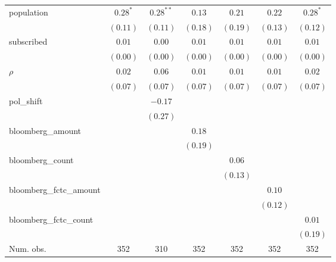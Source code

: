 \begin{table}[!h]
\begin{center}
\begin{tabular}{l c c c c c c }
population              & $0.28^{*}$   & $0.28^{**}$  & $0.13$       & $0.21$       & $0.22$       & $0.28^{*}$   \\
                        & $(0.11)$     & $(0.11)$     & $(0.18)$     & $(0.19)$     & $(0.13)$     & $(0.12)$     \\
subscribed              & $0.01$       & $0.00$       & $0.01$       & $0.01$       & $0.01$       & $0.01$       \\
                        & $(0.00)$     & $(0.00)$     & $(0.00)$     & $(0.00)$     & $(0.00)$     & $(0.00)$     \\
$\rho$                  & $0.02$       & $0.06$       & $0.01$       & $0.01$       & $0.01$       & $0.02$       \\
                        & $(0.07)$     & $(0.07)$     & $(0.07)$     & $(0.07)$     & $(0.07)$     & $(0.07)$     \\
pol\_shift              &              & $-0.17$      &              &              &              &              \\
                        &              & $(0.27)$     &              &              &              &              \\
bloomberg\_amount       &              &              & $0.18$       &              &              &              \\
                        &              &              & $(0.19)$     &              &              &              \\
bloomberg\_count        &              &              &              & $0.06$       &              &              \\
                        &              &              &              & $(0.13)$     &              &              \\
bloomberg\_fctc\_amount &              &              &              &              & $0.10$       &              \\
                        &              &              &              &              & $(0.12)$     &              \\
bloomberg\_fctc\_count  &              &              &              &              &              & $0.01$       \\
                        &              &              &              &              &              & $(0.19)$     \\
\midrule
Num. obs.               & 352          & 310          & 352          & 352          & 352          & 352          \\

\end{tabular}
\end{center}
\end{table}
